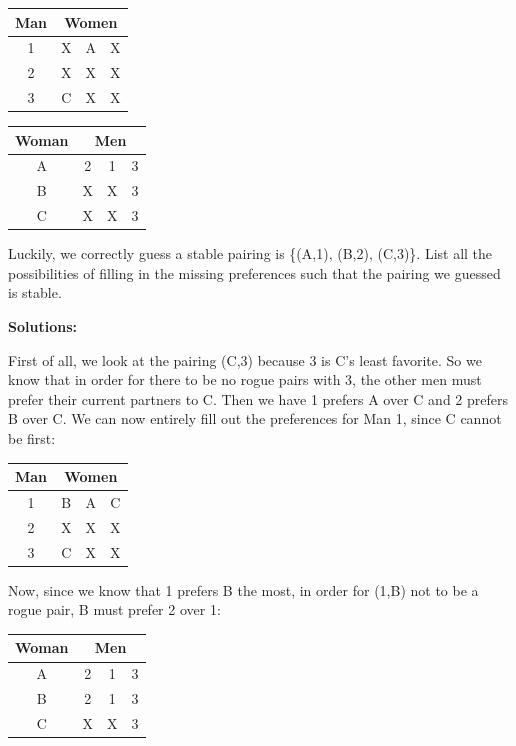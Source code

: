 \documentclass[11pt]{article}
\newif\ifsolutions
\begin{document}
\begin{qunlist}
\begin{itemize}
\begin{center}
\begin{tabular}{|c|ccc|}\hline 
Man&\multicolumn{3}{|c|}{Women}\\\hline 
1&X&A&X\\\hline 
2&X&X&X\\\hline 
3&C&X&X\\\hline
\end{tabular} 
\hspace{2cm}
\begin{tabular}{|c|ccc|}\hline 
Woman&\multicolumn{3}{|c|}{Men}\\\hline 
A&2&1&3\\\hline 
B&X&X&3\\\hline 
C&X&X&3\\\hline
\end{tabular}
\end{center}
        
Luckily, we correctly guess a stable pairing is \{(A,1), (B,2), (C,3)\}. 
List all the possibilities of filling in the missing preferences such that the pairing we guessed is stable.

\ifsolutions
\textbf{Solutions:}

First of all, we look at the pairing (C,3) because 3 is C's least favorite. So we know that in order for there to be no rogue pairs with 3, the other men must prefer their current partners to C. Then we have 1 prefers A over C and 2 prefers B over C. We can now entirely fill out the preferences for Man 1, since C cannot be first:

\begin{center}
\begin{tabular}{|c|ccc|}\hline 
Man&\multicolumn{3}{|c|}{Women}\\\hline 
1&B&A&C\\\hline 
2&X&X&X\\\hline 
3&C&X&X\\\hline
\end{tabular} 
\end{center}

Now, since we know that 1 prefers B the most, in order for (1,B) not to be a rogue pair, B must prefer 2 over 1:

\begin{center}
\begin{tabular}{|c|ccc|}\hline 
Woman&\multicolumn{3}{|c|}{Men}\\\hline 
A&2&1&3\\\hline 
B&2&1&3\\\hline 
C&X&X&3\\\hline
\end{tabular}
\end{center}


\end{itemize}
\end{qunlist}
\end{document}
